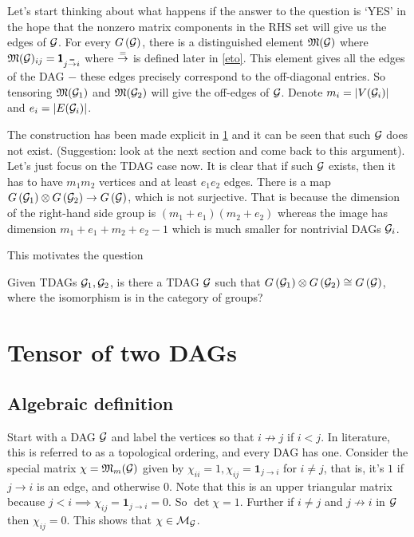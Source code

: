 Let's start thinking about what happens if the answer to the question is `YES' in the hope that the nonzero matrix components in the RHS set will give us the edges of ${\mathcal{G}}$. For every $G\left({\mathcal{G}}\right)$, there is a distinguished element ${\mathfrak{M}}({\mathcal{G}})$ where ${\mathfrak{M}}({\mathcal{G}})_{ij} =\pmb 1_{j\stackrel{=}{\to} i}$ where $\stackrel{=}{\to}$ is defined later in \cref{eto}. This element gives all the edges of the DAG $-$ these edges precisely correspond to the off-diagonal entries. So tensoring ${\mathfrak{M}}({\mathcal{G}}_1)$ and ${\mathfrak{M}}({\mathcal{G}}_2)$ will give the off-edges of ${\mathcal{G}}$. Denote $m_i=\left| V({\mathcal{G}}_i) \right|$ and $e_i = \left| E({\mathcal{G}}_i) \right|$.

The construction has been made explicit in \cref{tensorDAG} and it can be seen that such ${\mathcal{G}}$ does not exist. (Suggestion: look at the next section and come back to this argument). Let's just focus on the TDAG case now. It is clear that if such ${\mathcal{G}}$ exists, then it has to have $m_1m_2$ vertices and at least $e_1e_2$ edges. There is a map $G\left({\mathcal{G}}_1\right)\otimes G\left({\mathcal{G}}_2\right) \to G\left({\mathcal{G}}\right)$, which is not surjective. That is because the dimension of the right-hand side group is $(m_1+e_1)(m_2+e_2)$ whereas the image has dimension $m_1+e_1+m_2+e_2-1$ which is much smaller for nontrivial DAGs ${\mathcal{G}}_i$.

This motivates the question 
\begin{qs}
Given TDAGs ${\mathcal{G}}_1,{\mathcal{G}}_2$, is there a TDAG ${\mathcal{G}}$ such that $G\left({\mathcal{G}}_1\right)\otimes G\left({\mathcal{G}}_2\right) \cong G\left({\mathcal{G}}\right)$, where the isomorphism is in the category of groups? 
\end{qs}

\section{Tensor of two DAGs} \label{tensorDAG}

\subsection{Algebraic definition}
Start with a DAG ${\mathcal{G}}$ and label the vertices so that $i\not\to j$ if $i<j$. In literature, this is referred to as a topological ordering, and every DAG has one. Consider the special matrix $\chi={\mathfrak{M}}_m({{\mathcal{G}}})$ given by $\chi_{ii}=1, \chi_{ij} = \pmb{1}_{j\to i}$ for $i\neq j$, that is, it's $1$ if $j\to i$ is an edge, and otherwise $0$. Note that this is an upper triangular matrix because $j<i\implies \chi_{ij} = \pmb{1}_{j\to i} = 0$. So $\det \chi = 1$. Further if $i\neq j$ and $j\not \to i$ in ${\mathcal{G}}$ then $\chi_{ij}=0$. This shows that $\chi\in {\mathcal{M}}_{\mathcal{G}}$.

